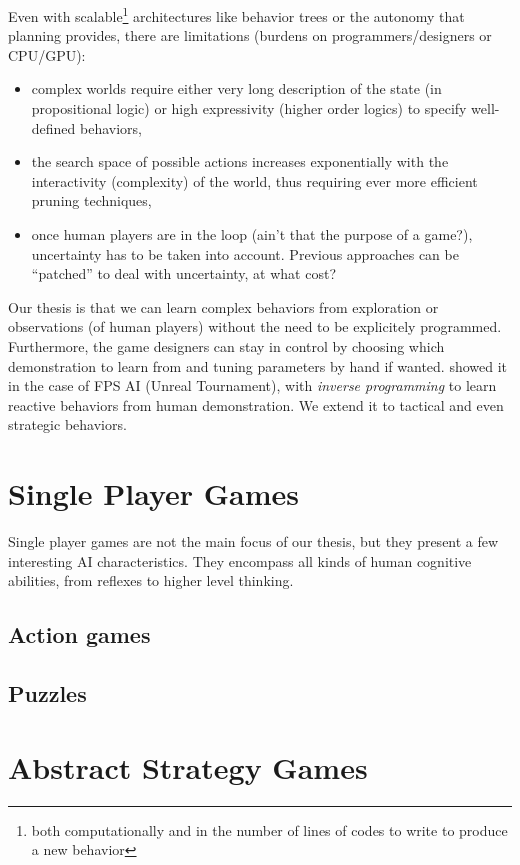 Even with scalable\footnote{both computationally and in the number of lines of codes to write to produce a new behavior} architectures like behavior trees or the autonomy that planning provides, there are limitations (burdens on programmers/designers or CPU/GPU):
\begin{itemize}
    \item complex worlds require either very long description of the state (in propositional logic) or high expressivity (higher order logics) to specify well-defined behaviors,
    \item the search space of possible actions increases exponentially with the interactivity (complexity) of the world, thus requiring ever more efficient pruning techniques,
    \item once human players are in the loop (ain't that the purpose of a game?), uncertainty has to be taken into account. Previous approaches can be ``patched'' to deal with uncertainty, at what cost?
\end{itemize}
Our thesis is that we can learn complex behaviors from exploration or observations (of human players) without the need to be explicitely programmed. Furthermore, the game designers can stay in control by choosing which demonstration to learn from and tuning parameters by hand if wanted. \citet{lehy04} showed it in the case of FPS AI (Unreal Tournament), with \textit{inverse programming} to learn reactive behaviors from human demonstration. We extend it to tactical and even strategic behaviors.

\section{Single Player Games}

Single player games are not the main focus of our thesis, but they present a few interesting AI characteristics. They encompass all kinds of human cognitive abilities, from reflexes to higher level thinking.

\subsection{Action games}

\subsection{Puzzles}

\section{Abstract Strategy Games}
